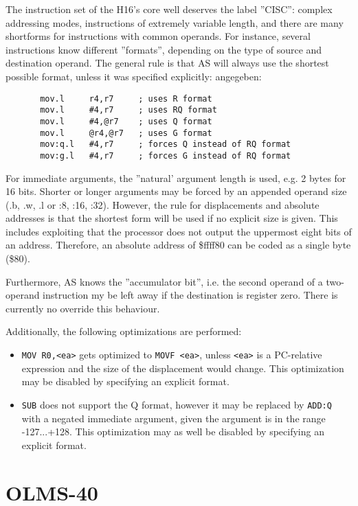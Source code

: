 \documentclass[12pt,twoside]{report}
\newcommand{\tty}[1]{{\tt #1}}
\begin{document}
The instruction set of the H16's core well deserves the label ''CISC'': complex
addressing modes, instructions of extremely variable length, and
there are many shortforms for instructions with common operands.  For
instance, several instructions know different ''formats'', depending
on the type of source and destination operand.  The general rule is
that AS will always use the shortest possible format, unless it was
specified explicitly:
angegeben:
\begin{verbatim}
       mov.l     r4,r7     ; uses R format
       mov.l     #4,r7     ; uses RQ format
       mov.l     #4,@r7    ; uses Q format
       mov.l     @r4,@r7   ; uses G format
       mov:q.l   #4,r7     ; forces Q instead of RQ format
       mov:g.l   #4,r7     ; forces G instead of RQ format
\end{verbatim}
For immediate arguments, the ''natural' argument length is used, e.g.
2 bytes for 16 bits.  Shorter or longer arguments may be forced by an
appended operand size (.b, .w, .l or :8, :16, :32).  However, the
rule for displacements and absolute addresses is that the shortest
form will be used if no explicit size is given.  This includes
exploiting that the processor does not output the uppermost eight
bits of an address.  Therefore, an absolute address of \$ffff80 can
be coded as a single byte (\$80).

Furthermore, AS knows the ''accumulator bit'', i.e. the second
operand of a two-operand instruction my be left away if the
destination is register zero.  There is currently no override this
behaviour.

Additionally, the following optimizations are performed:
\begin{itemize}
\item{\tty{MOV R0,<ea>} gets optimized to \tty{MOVF <ea>}, unless
      \tty{<ea>} is a PC-relative expression and the size of the
      displacement would change.  This optimization may be disabled
      by specifying an explicit format.}
\item{\tty{SUB} does not support the Q format, however it may be
      replaced by \tty{ADD:Q} with a negated immediate argument,
      given the argument is in the range -127...+128.  This
      optimization may as well be disabled by specifying an explicit
      format.}
\end{itemize}


\section{OLMS-40}
\end{document}
